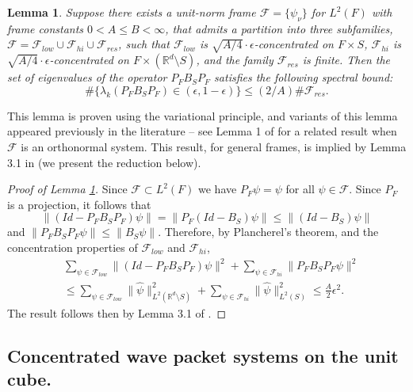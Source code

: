 \documentclass[conference]{IEEEtran}
\def\R{\mathbb{R}}
\newtheorem{lemma}[theorem]{Lemma}
\numberwithin{equation}{section}
\newcommand{\cI}{\mathcal I}
\newcommand{\cF}{\mathcal F}
\def\R{\mathbb{R}}
\begin{document}
\begin{lemma}\label{conc_frame:lem} Suppose there exists a unit-norm frame 
$\mathcal{F} = \{\psi_\nu\}$ 
 for $L^2(F)$ with frame constants $0<A \leq B < \infty$, that admits a partition into three subfamilies, $\mathcal{F} = \mathcal{F}_{low} \cup \mathcal{F}_{hi} \cup \mathcal{F}_{res}$, such that $\mathcal{F}_{low}$ is $\sqrt{A/4}\cdot\epsilon$-concentrated on $F \times S$, $\mathcal{F}_{hi}$ is $\sqrt{A/4}\cdot\epsilon$-concentrated on $F \times (\R^d \setminus S)$, and   the family $\cF_{res}$ is finite. 
%
Then the set of eigenvalues of the operator $P_F B_S P_F$ satisfies the following spectral bound: $$\# \{ \lambda_k(P_F B_S P_F) \in (\epsilon,1-\epsilon) \} \leq (2/A) \# \mathcal{F}_{res}. $$
\end{lemma}

This lemma is proven using the variational principle, and variants of this lemma appeared previously in the literature -- see Lemma 1 of \cite{israel15eigenvalue} for a related result when $\cF$ is an orthonormal system. This result, for general frames, is implied by Lemma 3.1 in \cite{marceca2023} (we present the reduction below). 

\begin{proof}[Proof of Lemma \ref{conc_frame:lem}]
Since $\cF \subset L^2(F)$ we have $P_F \psi = \psi$ for all $\psi \in \cF$. Since $P_F$ is a projection, it follows that
\[
\| (Id - P_F B_S P_F) \psi \| = \| P_F(Id - B_S) \psi \| \leq \|(Id - B_S) \psi \|
\]
and $\|P_F B_S P_F \psi \| \leq \| B_S \psi \|$.
Therefore, by Plancherel's theorem, and the concentration properties of $\cF_{low}$ and $\cF_{hi}$, 
\begin{align*}
&\sum_{\psi \in \cF_{low}} \| (Id -P_FB_SP_F) \psi \|^2 + \sum_{\psi \in \cF_{hi}} \| P_FB_SP_F \psi \|^2 \\
& \leq \sum_{\psi \in \cF_{low}} \| \widehat{\psi} \|_{L^2(\R^d \setminus S)}^2 + \sum_{\psi \in \cF_{hi}} \| \widehat{\psi} \|_{L^2( S)}^2 \leq \frac{A}{2} \epsilon^2.
\end{align*}
The result follows then by Lemma 3.1 of \cite{marceca2023}.
\end{proof}




\subsection{Concentrated wave packet systems on the unit cube.}
\end{document}
